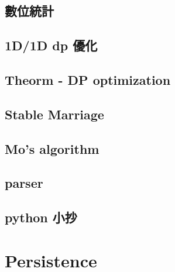 \subsection{數位統計}

\subsection{1D/1D dp 優化}

\subsection{Theorm - DP optimization}

\subsection{Stable Marriage}

\subsection{Mo's algorithm}

\subsection{parser}

\subsection{python 小抄}



\section{Persistence}

